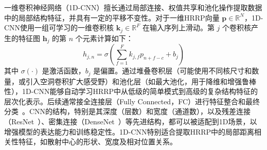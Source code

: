 一维卷积神经网络（1D-CNN）擅长通过局部连接、权值共享和池化操作提取数据中的局部结构特征，并具有一定的平移不变性。对于一维HRRP向量 $\mathbf{p} \in \mathbb{R}^N$，1D-CNN使用一组可学习的一维卷积核 $\mathbf{k}_j \in \mathbb{R}^F$ 在输入序列上滑动。第 $j$ 个卷积核产生的特征图 $\mathbf{h}_j$ 的第 $n$ 个元素计算如下：
\begin{equation}
    h_{j,n} = \sigma\left( \sum_{f=1}^{F} k_{j,f} p_{n+f-c} + b_j \right)
    \label{eq:1d_cnn_conv}
\end{equation}
其中 $\sigma(\cdot)$ 是激活函数，$b_j$ 是偏置。通过堆叠卷积层（可能使用不同核尺寸和数量，或引入空洞卷积扩大感受野）和池化层（如最大池化，用于降维和增强鲁棒性），1D-CNN能够自动学习HRRP中从低级的简单模式到高级的复杂结构特征的层次化表示。后续通常接全连接层（Fully Connected，FC）进行特征整合和最终分类~\cite{X}。CNN的结构，特别是其深度（层数）和宽度（通道数），以及残差连接（ResNet~\cite{X}）、密集连接（DenseNet~\cite{X}）等先进结构，都可以被适配到1D场景，以增强模型的表达能力和训练稳定性。1D-CNN特别适合提取HRRP中的局部距离相关性特征，如散射中心的形状、宽度及相对位置关系。

